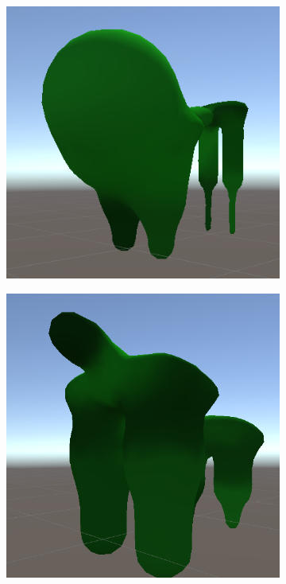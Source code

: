 \begin{figure}[ht]
\begin{subfigure}[b]{0.2\textwidth}
    \end{subfigure}
    \begin{subfigure}[b]{0.2\textwidth}
        \centering        
        \includegraphics[width=\textwidth, height=\textwidth]{resources/img/Finished_Creatures_4/creature_5}
    \end{subfigure}
    \begin{subfigure}[b]{0.2\textwidth}
        \centering
        \includegraphics[width=\textwidth, height=\textwidth]{resources/img/Finished_Creatures_4/creature_6}

\end{subfigure}
\end{figure}

